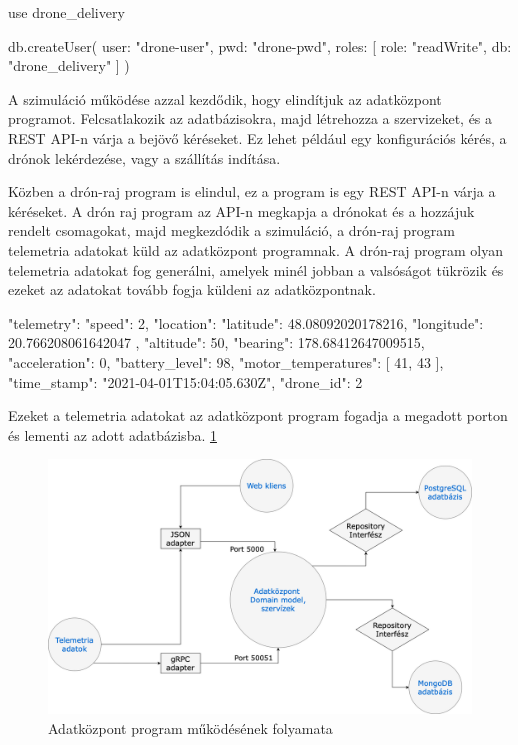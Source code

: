 \begin{python}
    use drone_delivery
\end{python}

\begin{python}

    db.createUser(
        {
        user: "drone-user",
        pwd: "drone-pwd",
        roles: [
            {
            role: "readWrite",
            db: "drone_delivery"
        }
        ]
    }
    )
\end{python}


A szimuláció működése azzal kezdődik, hogy elindítjuk az adatközpont programot.
Felcsatlakozik az adatbázisokra, majd létrehozza a szervizeket, és a REST API-n várja a bejövő kéréseket.
Ez lehet például egy konfigurációs kérés, a drónok lekérdezése, vagy a szállítás indítása.

Közben a drón-raj program is elindul, ez a program is egy REST API-n várja a kéréseket.
A drón raj program az API-n megkapja a drónokat és a hozzájuk rendelt csomagokat, majd megkezdódik a szimuláció, a drón-raj program telemetria adatokat küld az adatközpont programnak.
A drón-raj program olyan telemetria adatokat fog generálni, amelyek minél jobban a valsóságot tükrözik és ezeket az adatokat tovább fogja küldeni az adatközpontnak.
\begin{python}
{
    "telemetry": {
    "speed": 2,
    "location": {
        "latitude": 48.08092020178216,
        "longitude": 20.766208061642047
    },
    "altitude": 50,
    "bearing": 178.68412647009515,
    "acceleration": 0,
    "battery_level": 98,
    "motor_temperatures": [
    41,
    43
    ],
    "time_stamp": "2021-04-01T15:04:05.630Z",
    "drone_id": 2
}
}
\end{python}

Ezeket a telemetria adatokat az adatközpont program fogadja a megadott porton és lementi az adott adatbázisba. \ref{fig:adatkozpont-flow}

\begin{figure}[h]
    \centering
    \includegraphics[scale=0.3]{images/adatkozpont-flow.png}
    \caption{Adatközpont program működésének folyamata}
    \label{fig:adatkozpont-flow}
\end{figure}

